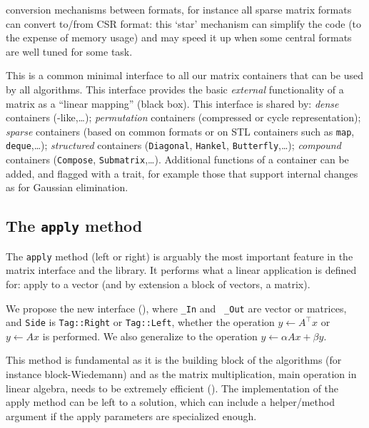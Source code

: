 %
	 conversion mechanisms between formats, for instance all
	 sparse matrix formats can convert to/from CSR format:  this `star'
	 mechanism can simplify the code (to the expense of memory usage) and
	 may speed it up when some central formats  are
	 well tuned for some task.
%
	 \par
%
This is a common minimal interface to all our matrix containers that can be
used by all algorithms.
This interface provides the basic {\em external}
functionality of a matrix as a
 ``linear mapping'' (black box).
This interface is shared by: \emph{dense}
containers (\blas-like,\ldots); \emph{permutation} containers (compressed
 or cycle representation); \emph{sparse} containers (based on
common formats or on STL containers such as {\tt map}, {\tt deque},\ldots);
\emph{structured} containers ({\tt Diagonal}, {\tt Hankel}, {\tt Butterfly},\ldots);
\emph{compound} containers ({\tt Compose}, {\tt Submatrix},\ldots).
Additional functions of a container can be added, and flagged with a trait, for
example those that support internal changes as for Gaussian elimination.
%
\subsection{The \texttt{apply} method}\label{ssec:apply}
%
%
\par
%
The \texttt{apply} method (left or right) is arguably the most important
feature in the matrix interface and the \linbox library. It performs what a
linear application is defined for: apply to a vector (and by extension  a block
of vectors, \ie a matrix).
%
\par
%
We propose the new interface (), where {\tt \_In} and {\tt
\_Out} are vector or matrices, and {\tt Side} is {\tt Tag::Right} or
{\tt Tag::Left}, whether the operation $y \gets A^{\top} x$ or  $y \gets A x$ is
performed. We also generalize to the operation $y \gets \alpha A x + \beta y$.
%

%
This method is fundamental as it is the building block of the \applin
algorithms (for instance block-Wiedemann) and as the matrix
multiplication, main operation in linear algebra, needs to be extremely efficient ().
%
%
%
The implementation of the apply method can be left to a \mul solution,
which can include a helper/method argument if the apply
parameters are specialized enough.
%
%
%
